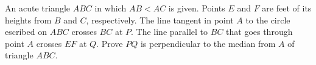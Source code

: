 An acute triangle $ABC$ in which $AB<AC$ is given. Points $E$ and $F$ are feet of its heights from $B$ and $C$, respectively. The line tangent in point $A$ to the circle escribed on $ABC$ crosses $BC$ at $P$. The line parallel to $BC$ that goes through point $A$ crosses $EF$ at $Q$. Prove $PQ$ is perpendicular to the median from $A$ of triangle $ABC$.
